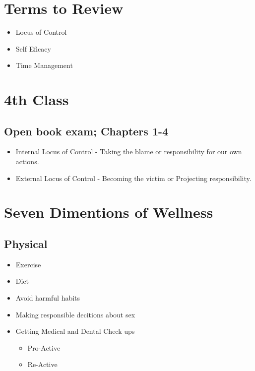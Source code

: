 \documentclass[]{article}
\begin{document}
\section{Terms to Review}
\begin{itemize}
	\item Locus of Control
	\item Self Eficacy
	\item Time Management
\end{itemize}

\section{4th Class}
\subsection{Open book exam; Chapters 1-4 }
\begin{itemize}
	\item Internal Locus of Control - Taking the blame or responsibility for our own actions.
	\item External Locus of Control - Becoming the victim or Projecting responsibility.
\end{itemize}

\section{Seven Dimentions of Wellness}
\subsection{Physical}
\begin{itemize}
	\item Exercise 
	\item Diet
	\item Avoid harmful habits
	\item Making responsible decitions about sex
	\item Getting Medical and Dental Check ups
	\begin{itemize}
		\item Pro-Active
		\item Re-Active
	\end{itemize}
\end{itemize}
\end{document}
